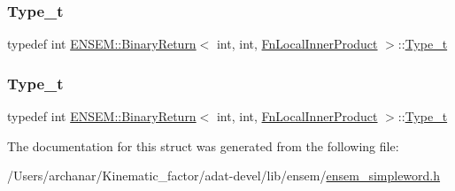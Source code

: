 \mbox{\label{structENSEM_1_1BinaryReturn_3_01int_00_01int_00_01FnLocalInnerProduct_01_4_abc5bd3e21df0f42ad6b223a7b59549ba}} 
\subsubsection{\texorpdfstring{Type\_t}{Type\_t}\hspace{0.1cm}{\footnotesize\ttfamily [2/3]}}
{\footnotesize\ttfamily typedef int \mbox{\hyperlink{structENSEM_1_1BinaryReturn}{E\+N\+S\+E\+M\+::\+Binary\+Return}}$<$ int, int, \mbox{\hyperlink{structENSEM_1_1FnLocalInnerProduct}{Fn\+Local\+Inner\+Product}} $>$\+::\mbox{\hyperlink{structENSEM_1_1BinaryReturn_3_01int_00_01int_00_01FnLocalInnerProduct_01_4_abc5bd3e21df0f42ad6b223a7b59549ba}{Type\+\_\+t}}}

\mbox{\label{structENSEM_1_1BinaryReturn_3_01int_00_01int_00_01FnLocalInnerProduct_01_4_abc5bd3e21df0f42ad6b223a7b59549ba}} 
\subsubsection{\texorpdfstring{Type\_t}{Type\_t}\hspace{0.1cm}{\footnotesize\ttfamily [3/3]}}
{\footnotesize\ttfamily typedef int \mbox{\hyperlink{structENSEM_1_1BinaryReturn}{E\+N\+S\+E\+M\+::\+Binary\+Return}}$<$ int, int, \mbox{\hyperlink{structENSEM_1_1FnLocalInnerProduct}{Fn\+Local\+Inner\+Product}} $>$\+::\mbox{\hyperlink{structENSEM_1_1BinaryReturn_3_01int_00_01int_00_01FnLocalInnerProduct_01_4_abc5bd3e21df0f42ad6b223a7b59549ba}{Type\+\_\+t}}}



The documentation for this struct was generated from the following file\+:\begin{DoxyCompactItemize}
\item 
/\+Users/archanar/\+Kinematic\+\_\+factor/adat-\/devel/lib/ensem/\mbox{\hyperlink{adat-devel_2lib_2ensem_2ensem__simpleword_8h}{ensem\+\_\+simpleword.\+h}}\end{DoxyCompactItemize}
